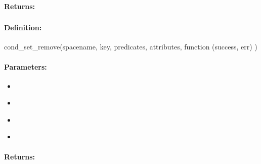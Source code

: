 \paragraph{Returns:}


\pagebreak
\subsubsection{}
\label{api:nodejs:cond_set_remove}


\paragraph{Definition:}
\begin{javascriptcode}
cond_set_remove(spacename, key, predicates, attributes, function (success, err) {})
\end{javascriptcode}
\paragraph{Parameters:}
\begin{itemize}[noitemsep]
\item {}\\

\item {}\\

\item {}\\

\item {}\\

\end{itemize}

\paragraph{Returns:}


\pagebreak
\subsubsection{}
\label{api:nodejs:group_set_remove}


